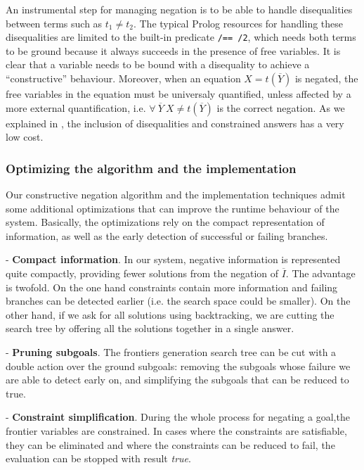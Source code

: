 \documentclass{llncs}
\begin{document}
An instrumental step for managing negation is to be able to handle
disequalities between terms such as $t_1 \neq t_2$.  The typical
Prolog resources for handling these disequalities are limited to the
built-in predicate {\tt /== /2}, which needs both terms to be ground
because it always succeeds in the presence of free variables.  It is
clear that a variable needs to be bound with a disequality to achieve
a ``constructive'' behaviour.  Moreover, when an equation $X =
t(\overline{Y})$ is negated, the free variables in the equation must
be universaly quantified, unless affected by a more external
quantification, i.e. $\forall~ \overline{Y}~X \neq t(\overline{Y})$ is
the correct negation.  As we explained in \cite{SusanaPADL2000}, the
inclusion of disequalities and constrained answers has a very low
cost.



\subsubsection{Optimizing the algorithm and the implementation}
\label{optimization}

Our constructive negation algorithm and the implementation techniques
admit some additional optimizations that can improve the runtime
behaviour of the system. Basically, the optimizations rely on the
compact representation of information, as well as the early detection
of successful or failing branches.

\noindent
- {\bf Compact information}. In our system, negative information is
represented quite compactly, providing fewer solutions from the
negation of $\overline{I}$. The advantage is twofold. On the one hand
constraints contain more information and failing branches can be
detected earlier (i.e. the search space could be smaller). On the
other hand, if we ask for all solutions using backtracking, we are
cutting the search tree by offering all the solutions together in a
single answer.

\noindent
- {\bf Pruning subgoals}. The frontiers generation search tree can be
cut with a double action over the ground subgoals: removing the
subgoals whose failure we are able to detect early on, and simplifying the
subgoals that can be reduced to true.

\noindent
- {\bf Constraint simplification}. During the whole process for negating
a goal,the frontier variables are constrained. In cases where the
constraints are satisfiable, they can be eliminated and where the
constraints can be reduced to fail, the evaluation can be stopped with
result \emph{true}.
 
\end{document}
